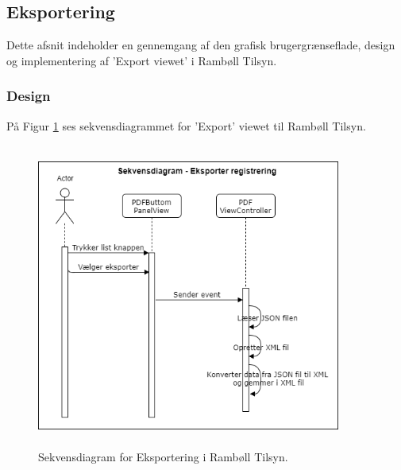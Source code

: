 \subsection{Eksportering} \label{sec:Eksport}
Dette afsnit indeholder en gennemgang af den grafisk brugergrænseflade, design og implementering af 'Export viewet' i Rambøll Tilsyn.

\subsubsection{Design}
På Figur \ref{fig:EksporterSekvensDiagram} ses sekvensdiagrammet for 'Export' viewet til Rambøll Tilsyn.
\begin{figure}[H] %
	\centering
	\includegraphics[height=10cm, width=10cm]{../ArkitekturDesign/Design/Eksportering/EksporterSekvensDiagram}
	\caption{Sekvensdiagram for Eksportering i Rambøll Tilsyn.}
	\label{fig:EksporterSekvensDiagram}
\end{figure}

\clearpage

